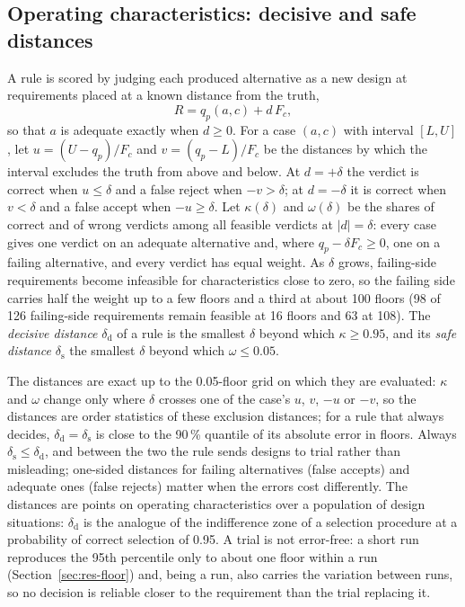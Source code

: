 \documentclass[pdflatex,sn-basic,lineno]{sn-jnl}
\begin{document}
\subsection{Operating characteristics: decisive and safe distances}\label{sec:distances}

A rule is scored by judging each produced alternative as a new design at requirements placed at a known distance from the truth,
\begin{equation}
R = q_p(a,c) + d\,F_c ,
\label{eq:requirement}
\end{equation}
so that $a$ is adequate exactly when $d\ge 0$. For a case $(a,c)$ with interval $[L,U]$, let $u=(U-q_p)/F_c$ and $v=(q_p-L)/F_c$ be the distances by which the interval excludes the truth from above and below. At $d=+\delta$ the verdict is correct when $u\le\delta$ and a false reject when $-v>\delta$; at $d=-\delta$ it is correct when $v<\delta$ and a false accept when $-u\ge\delta$. Let $\kappa(\delta)$ and $\omega(\delta)$ be the shares of correct and of wrong verdicts among all feasible verdicts at $|d|=\delta$: every case gives one verdict on an adequate alternative and, where $q_p-\delta F_c\ge0$, one on a failing alternative, and every verdict has equal weight. As $\delta$ grows, failing-side requirements become infeasible for characteristics close to zero, so the failing side carries half the weight up to a few floors and a third at about 100 floors (98 of 126 failing-side requirements remain feasible at 16 floors and 63 at 108). The \emph{decisive distance} $\delta_\mathrm{d}$ of a rule is the smallest $\delta$ beyond which $\kappa\ge 0.95$, and its \emph{safe distance} $\delta_\mathrm{s}$ the smallest $\delta$ beyond which $\omega\le 0.05$.

The distances are exact up to the 0.05-floor grid on which they are evaluated: $\kappa$ and $\omega$ change only where $\delta$ crosses one of the case's $u$, $v$, $-u$ or $-v$, so the distances are order statistics of these exclusion distances; for a rule that always decides, $\delta_\mathrm{d}=\delta_\mathrm{s}$ is close to the 90\,\% quantile of its absolute error in floors. Always $\delta_\mathrm{s}\le\delta_\mathrm{d}$, and between the two the rule sends designs to trial rather than misleading; one-sided distances for failing alternatives (false accepts) and adequate ones (false rejects) matter when the errors cost differently. The distances are points on operating characteristics over a population of design situations: $\delta_\mathrm{d}$ is the analogue of the indifference zone of a selection procedure \citep{bechhofer1954single} at a probability of correct selection of 0.95. A trial is not error-free: a short run reproduces the 95th percentile only to about one floor within a run (Section~\ref{sec:res-floor}) and, being a run, also carries the variation between runs, so no decision is reliable closer to the requirement than the trial replacing it.
\end{document}
